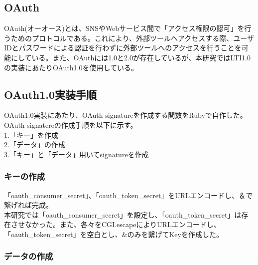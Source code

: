 \subsection{OAuth}
OAuth(オーオース)とは、SNSやWebサービス間で「アクセス権限の認可」を行うためのプロトコルである。これにより、外部ツールへアクセスする際、ユーザIDとパスワードによる認証を行わずに外部ツールへのアクセスを行うことを可能にしている。また、OAuthには1.0と2.0が存在しているが、本研究ではLTI1.0の実装にあたりOAuth1.0を使用している。
\subsection{OAuth1.0実装手順}
OAuth1.0実装にあたり、OAuth signatureを作成する関数をRubyで自作した。\\
OAuth signatereの作成手順を以下に示す。\\
1.「キー」を作成\\
2.「データ」の作成\\
3.「キー」と「データ」用いてsignatureを作成\\
\subsubsection{キーの作成}
「oauth_consumer_secret」、「oauth_token_secret」をURLエンコードし、＆で繋げれば完成。\\
本研究では「oauth_consumer_secret」を設定し、「oauth_token_secret」は存在させなかった。また、各々をCGI.escapeによりURLエンコードし、「oauth_token_secret」を空白とし、&のみを繋げてKeyを作成した。
\subsubsection{データの作成}

